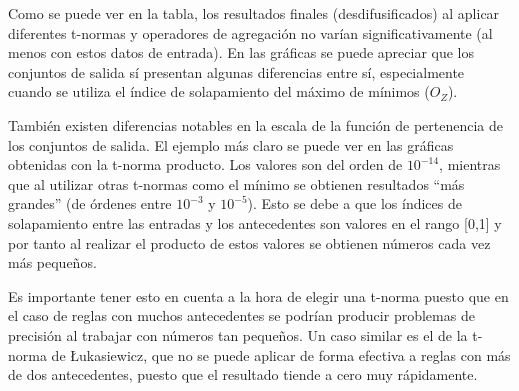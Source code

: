 Como se puede ver en la tabla, los resultados finales (desdifusificados) al aplicar diferentes t-normas y operadores de agregación no varían significativamente (al menos con estos datos de entrada). En las gráficas se puede apreciar que los conjuntos de salida sí presentan algunas diferencias entre sí, especialmente cuando se utiliza el índice de solapamiento del máximo de mínimos ($O_Z$).

También existen diferencias notables en la escala de la función de pertenencia de los conjuntos de salida. El ejemplo más claro se puede ver en las gráficas obtenidas con la t-norma producto. Los valores son del orden de $10^{-14}$, mientras que al utilizar otras t-normas como el mínimo se obtienen resultados ``más grandes'' (de órdenes entre $10^{-3}$ y $10^{-5}$). Esto se debe a que los índices de solapamiento entre las entradas y los antecedentes son valores en el rango [0,1] y por tanto al realizar el producto de estos valores se obtienen números cada vez más pequeños. 

Es importante tener esto en cuenta a la hora de elegir una t-norma puesto que en el caso de reglas con muchos antecedentes se podrían producir problemas de precisión al trabajar con números tan pequeños. Un caso similar es el de la t-norma de \L{}ukasiewicz, que no se puede aplicar de forma efectiva a reglas con más de dos antecedentes, puesto que el resultado tiende a cero muy rápidamente.
